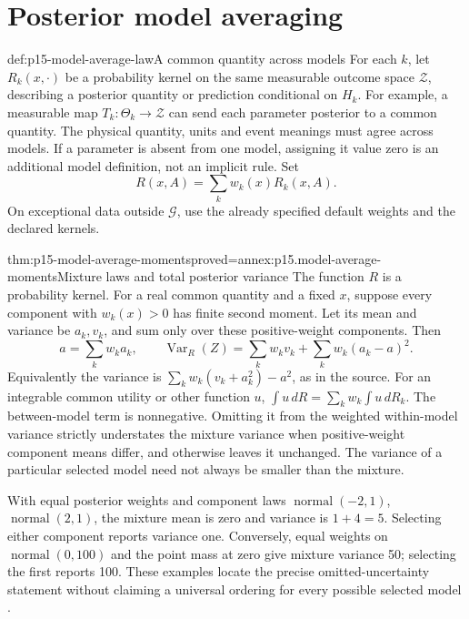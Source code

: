 \section{Posterior model averaging}
\label{sec:p15-posterior-model-averaging}

\begin{hbdefinition}{def:p15-model-average-law}{A common quantity across models}
For each \(k\), let \(R_k(x,\cdot)\) be a probability kernel on the same
measurable outcome space \(\mathcal Z\), describing a posterior quantity
or prediction conditional on \(H_k\). For example, a measurable map
\(T_k:\Theta_k\to\mathcal Z\) can send each parameter posterior to a
common quantity. The physical quantity, units and event meanings must
agree across models. If a parameter is absent from one model, assigning
it value zero is an additional model definition, not an implicit rule.
Set
\[
 R(x,A)=\sum_kw_k(x)R_k(x,A).
\]
On exceptional data outside \(\mathcal G\), use the already specified
default weights and the declared kernels.
\end{hbdefinition}

\begin{hbtheorem}{thm:p15-model-average-moments}{proved=annex:p15.model-average-moments}{Mixture laws and total posterior variance}
The function \(R\) is a probability kernel. For a real common quantity
and a fixed \(x\), suppose every component with \(w_k(x)>0\) has finite
second moment. Let its mean and variance be \(a_k,v_k\), and sum only
over these positive-weight components. Then
\[
 a=\sum_kw_ka_k,\qquad
 \operatorname{Var}_R(Z)=\sum_kw_kv_k+\sum_kw_k(a_k-a)^2.
\]
Equivalently the variance is
\(\sum_kw_k(v_k+a_k^2)-a^2\), as in the source.
For an integrable common utility or other function \(u\),
\(\int u\,dR=\sum_kw_k\int u\,dR_k\).
The between-model term is nonnegative. Omitting it from the weighted
within-model variance strictly understates the mixture variance when
positive-weight component means differ, and otherwise leaves it unchanged.
The variance
of a particular selected model need not always be smaller than the mixture.
\end{hbtheorem}

With equal posterior weights and component laws
\(\operatorname{normal}(-2,1)\), \(\operatorname{normal}(2,1)\), the
mixture mean is zero and variance is \(1+4=5\). Selecting either component
reports variance one. Conversely, equal weights on
\(\operatorname{normal}(0,100)\) and the point mass at zero give mixture
variance 50; selecting the first reports 100. These examples locate the
precise omitted-uncertainty statement without claiming a universal ordering
for every possible selected model
\cite[Sec.~6.1, eqs.~(17)--(19)]{KassRaftery1995BayesFactors}.

